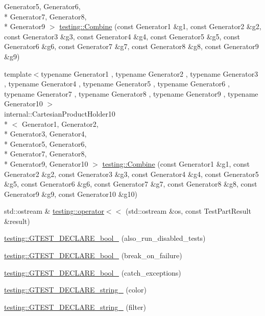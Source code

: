 \begin{DoxyCompactItemize}
Generator5, Generator6, \\*
Generator7, Generator8, \\*
Generator9 $>$ \hyperlink{namespacetesting_a928ed7d1e8dd1dde0da5d7d3838384d2}{testing\-::\-Combine} (const Generator1 \&g1, const Generator2 \&g2, const Generator3 \&g3, const Generator4 \&g4, const Generator5 \&g5, const Generator6 \&g6, const Generator7 \&g7, const Generator8 \&g8, const Generator9 \&g9)
\item 
{\footnotesize template$<$typename Generator1 , typename Generator2 , typename Generator3 , typename Generator4 , typename Generator5 , typename Generator6 , typename Generator7 , typename Generator8 , typename Generator9 , typename Generator10 $>$ }\\internal\-::\-Cartesian\-Product\-Holder10\\*
$<$ Generator1, Generator2, \\*
Generator3, Generator4, \\*
Generator5, Generator6, \\*
Generator7, Generator8, \\*
Generator9, Generator10 $>$ \hyperlink{namespacetesting_a0590cd15c5bafaea9f5d2b1061e0a28b}{testing\-::\-Combine} (const Generator1 \&g1, const Generator2 \&g2, const Generator3 \&g3, const Generator4 \&g4, const Generator5 \&g5, const Generator6 \&g6, const Generator7 \&g7, const Generator8 \&g8, const Generator9 \&g9, const Generator10 \&g10)
\item 
std\-::ostream \& \hyperlink{namespacetesting_a7c88897836b9f492190fb2b9dfa3a327}{testing\-::operator$<$$<$} (std\-::ostream \&os, const Test\-Part\-Result \&result)
\item 
\hyperlink{namespacetesting_a4c08ba9fcb0581c61e25968e520efa48}{testing\-::\-G\-T\-E\-S\-T\-\_\-\-D\-E\-C\-L\-A\-R\-E\-\_\-bool\-\_\-} (also\-\_\-run\-\_\-disabled\-\_\-tests)
\item 
\hyperlink{namespacetesting_a5868c3980b2f69f511fc8c3de7cdfc17}{testing\-::\-G\-T\-E\-S\-T\-\_\-\-D\-E\-C\-L\-A\-R\-E\-\_\-bool\-\_\-} (break\-\_\-on\-\_\-failure)
\item 
\hyperlink{namespacetesting_ab6f1777f7b740f31e41f7da017447b58}{testing\-::\-G\-T\-E\-S\-T\-\_\-\-D\-E\-C\-L\-A\-R\-E\-\_\-bool\-\_\-} (catch\-\_\-exceptions)
\item 
\hyperlink{namespacetesting_a0f658c915a1e60996a2ab00a06612723}{testing\-::\-G\-T\-E\-S\-T\-\_\-\-D\-E\-C\-L\-A\-R\-E\-\_\-string\-\_\-} (color)
\item 
\hyperlink{namespacetesting_a20d69860ce843142c7f740262e6b0c9a}{testing\-::\-G\-T\-E\-S\-T\-\_\-\-D\-E\-C\-L\-A\-R\-E\-\_\-string\-\_\-} (filter)

\end{DoxyCompactItemize}
